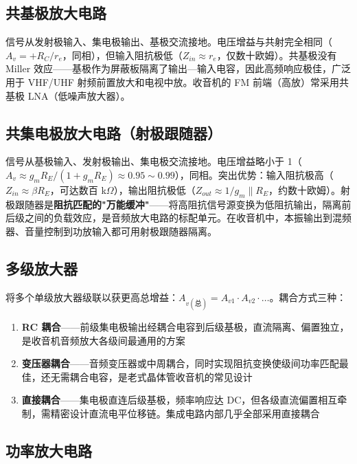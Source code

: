 \documentclass[12pt,UTF8]{ctexbook}
\begin{document}
\subsection{共基极放大电路}

信号从发射极输入、集电极输出、基极交流接地。电压增益与共射完全相同（$A_v = +R_C/r_e$，同相），但输入阻抗极低（$Z_{in} \approx r_e$，仅数十欧姆）。共基极没有 Miller 效应——基极作为屏蔽板隔离了输出—输入电容，因此高频响应极佳，广泛用于 VHF/UHF 射频前置放大和电视中放。收音机的 FM 前端（高放）常采用共基极 LNA（低噪声放大器）。

\subsection{共集电极放大电路（射极跟随器）}

信号从基极输入、发射极输出、集电极交流接地。电压增益略小于 1（$A_v \approx g_m R_E/(1+g_m R_E) \approx 0.95\sim0.99$），同相。突出优势：输入阻抗极高（$Z_{in} \approx \beta R_E$，可达数百 k$\Omega$），输出阻抗极低（$Z_{out} \approx 1/g_m\parallel R_E$，约数十欧姆）。射极跟随器是\textbf{阻抗匹配的"万能缓冲"}——将高阻抗信号源变换为低阻抗输出，隔离前后级之间的负载效应，是音频放大电路的标配单元。在收音机中，本振输出到混频器、音量控制到功放输入都可用射极跟随器隔离。

\subsection{多级放大器}

将多个单级放大器级联以获更高总增益：$A_{v(\text{总})} = A_{v1} \cdot A_{v2} \cdot \ldots$。耦合方式三种：
\begin{enumerate}
\item \textbf{RC 耦合}——前级集电极输出经耦合电容到后级基极，直流隔离、偏置独立，是收音机音频放大各级间最通用的方案
\item \textbf{变压器耦合}——音频变压器或中周耦合，同时实现阻抗变换使级间功率匹配最佳，还无需耦合电容，是老式晶体管收音机的常见设计
\item \textbf{直接耦合}——集电极直连后级基极，频率响应达 DC，但各级直流偏置相互牵制，需精密设计直流电平位移链。集成电路内部几乎全部采用直接耦合
\end{enumerate}

\subsection{功率放大电路}
\end{document}
